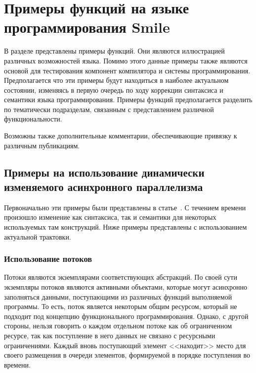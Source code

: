 \chapter[Примеры функций]{Примеры функций на языке программирования Smile}
\label{examples}

В разделе представлены примеры функций. Они являются иллюстрацией различных возможностей языка. Помимо этого данные примеры также являются основой для тестирования компонент компилятора и системы программирования. Предполагается что эти примеры будут находиться в наиболее актуальном состоянии, изменяясь в первую очередь по ходу коррекции синтаксиса и семантики языка программирования. Примеры функций предполагается разделить по тематически подразделам, связанным с представлением различной функциональности.

Возможны также дополнительные комментарии, обеспечивающие привязку к различным публикациям.

\section{Примеры на использование динамически изменяемого асинхронного параллелизма}
\label{examples:stream}

Первоначально эти примеры были представлены в статье~\cite{dyn-ru, dyn}. С течением времени произошло изменение как синтаксиса, так и семантики для некоторых используемых там конструкций. Ниже примеры представлены с использованием актуальной трактовки.


\subsection{Использование потоков}

Потоки являются экземплярами соответствующих абстракций. По своей сути экземпляры потоков являются активными объектами, которые могут асинхронно заполняться данными, поступающими из различных функций выполняемой программы. То есть, поток является некоторым общим ресурсом, который не подходит под концепцию функционального программирования. Однако, с другой стороны, нельзя говорить о каждом отдельном потоке как об ограниченном ресурсе, так как поступление в него данных не связано с ресурсными ограничениями. Каждый вновь поступающий элемент <<находит>> место для своего размещения в очереди элементов, формируемой в порядке поступления во времени.

